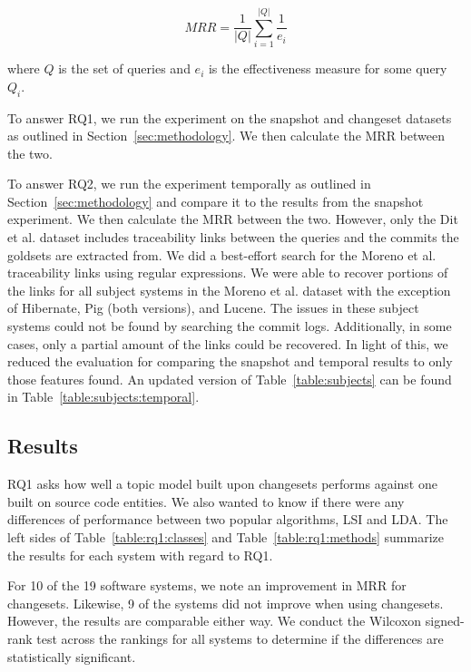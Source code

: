 \begin{equation}
    MRR = \frac{1}{|Q|} \sum_{i=1}^{|Q|} \frac{1}{e_i}
\end{equation}

where $Q$ is the set of queries
and $e_i$ is the effectiveness measure for some query $Q_i$.

To answer RQ1, we run the experiment on the snapshot and changeset
datasets as outlined in Section~\ref{sec:methodology}.
We then calculate the MRR between the two.

To answer RQ2, we run the experiment temporally as outlined in Section~\ref{sec:methodology}
and compare it to the results from the snapshot experiment.
We then calculate the MRR between the two.
However, only the Dit et al. dataset includes traceability links between
the queries and the commits the goldsets are extracted from.
We did a best-effort search for the Moreno et al. traceability links
using regular expressions.
We were able to recover portions of the links for all subject systems in
the Moreno et al. dataset with the exception of Hibernate, Pig (both versions), and Lucene.
The issues in these subject systems could not be found by searching the commit logs.
Additionally, in some cases, only a partial amount of the links could be
recovered. In light of this, we reduced the evaluation for comparing the
snapshot and temporal results to only those features found.
An updated version of Table~\ref{table:subjects} can be found in Table~\ref{table:subjects:temporal}.


\subsection{Results}



RQ1 asks how well a topic model built upon changesets performs against
one built on source code entities.
We also wanted to know if there were any differences of performance
between two popular algorithms, LSI and LDA.
The left sides of Table~\ref{table:rq1:classes} and Table~\ref{table:rq1:methods}
summarize the results for each system with regard to RQ1.

For 10 of the 19 software systems, we note an improvement in MRR for changesets.
Likewise, 9 of the systems did not improve when using changesets.
However, the results are comparable either way.
We conduct the Wilcoxon signed-rank test across the rankings for all systems
to determine if the differences are statistically significant.


